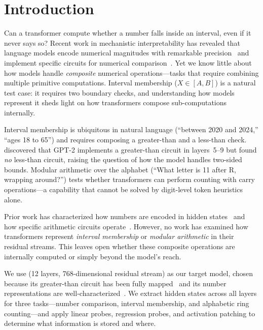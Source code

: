 \section{Introduction}
\label{sec:introduction}

Can a transformer compute whether a number falls inside an interval, even if it never says so? Recent work in mechanistic interpretability has revealed that language models encode numerical magnitudes with remarkable precision~\citep{levy2024language, kadlcik2025pretrained} and implement specific circuits for numerical comparison~\citep{hanna2023how}. Yet we know little about how models handle \emph{composite} numerical operations---tasks that require combining multiple primitive computations. Interval membership ($X \in [A, B]$) is a natural test case: it requires two boundary checks, and understanding how models represent it sheds light on how transformers compose sub-computations internally.

 Interval membership is ubiquitous in natural language (``between 2020 and 2024,'' ``ages 18 to 65'') and requires composing a greater-than and a less-than check. \citet{hanna2023how} discovered that GPT-2 implements a greater-than circuit in layers~5--9 but found \emph{no} less-than circuit, raising the question of how the model handles two-sided bounds. Modular arithmetic over the alphabet (``What letter is 11 after R, wrapping around?'') tests whether transformers can perform counting with carry operations---a capability that cannot be solved by digit-level token heuristics alone.

 Prior work has characterized how numbers are encoded in hidden states~\citep{levy2024language, kadlcik2025pretrained, wallace2019nlp} and how specific arithmetic circuits operate~\citep{hanna2023how, stolfo2023mechanistic, quirke2024understanding}. However, no work has examined how transformers represent \emph{interval membership} or \emph{modular arithmetic} in their residual streams. This leaves open whether these composite operations are internally computed or simply beyond the model's reach.

 We use \gptsmall (12 layers, 768-dimensional residual stream) as our target model, chosen because its greater-than circuit has been fully mapped~\citep{hanna2023how} and its number representations are well-characterized~\citep{levy2024language}. We extract hidden states across all layers for three tasks---number comparison, interval membership, and alphabetic ring counting---and apply linear probes, regression probes, and activation patching to determine what information is stored and where.

